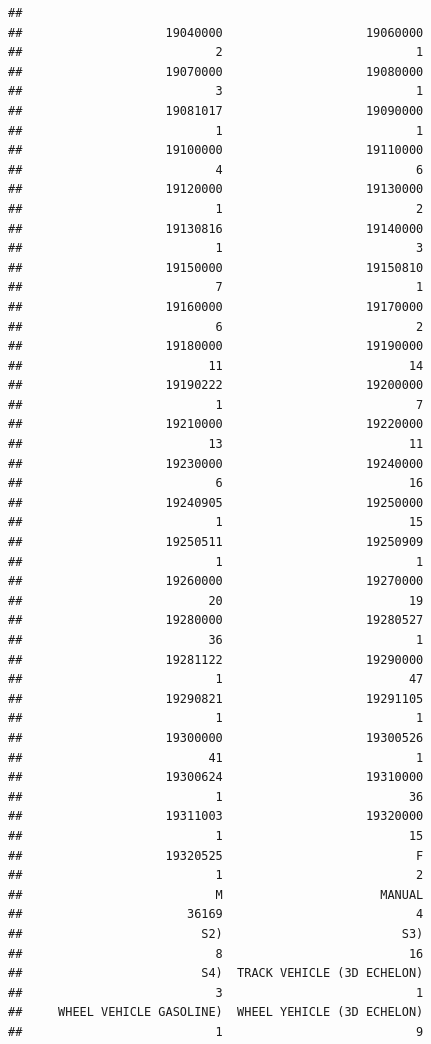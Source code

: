 \documentclass[]{book}
\begin{document}
\begin{verbatim}
## 
##                    19040000                    19060000 
##                           2                           1 
##                    19070000                    19080000 
##                           3                           1 
##                    19081017                    19090000 
##                           1                           1 
##                    19100000                    19110000 
##                           4                           6 
##                    19120000                    19130000 
##                           1                           2 
##                    19130816                    19140000 
##                           1                           3 
##                    19150000                    19150810 
##                           7                           1 
##                    19160000                    19170000 
##                           6                           2 
##                    19180000                    19190000 
##                          11                          14 
##                    19190222                    19200000 
##                           1                           7 
##                    19210000                    19220000 
##                          13                          11 
##                    19230000                    19240000 
##                           6                          16 
##                    19240905                    19250000 
##                           1                          15 
##                    19250511                    19250909 
##                           1                           1 
##                    19260000                    19270000 
##                          20                          19 
##                    19280000                    19280527 
##                          36                           1 
##                    19281122                    19290000 
##                           1                          47 
##                    19290821                    19291105 
##                           1                           1 
##                    19300000                    19300526 
##                          41                           1 
##                    19300624                    19310000 
##                           1                          36 
##                    19311003                    19320000 
##                           1                          15 
##                    19320525                           F 
##                           1                           2 
##                           M                      MANUAL 
##                       36169                           4 
##                         S2)                         S3) 
##                           8                          16 
##                         S4)  TRACK VEHICLE (3D ECHELON) 
##                           3                           1 
##     WHEEL VEHICLE GASOLINE)  WHEEL YEHICLE (3D ECHELON) 
##                           1                           9
\end{verbatim}
\end{document}
